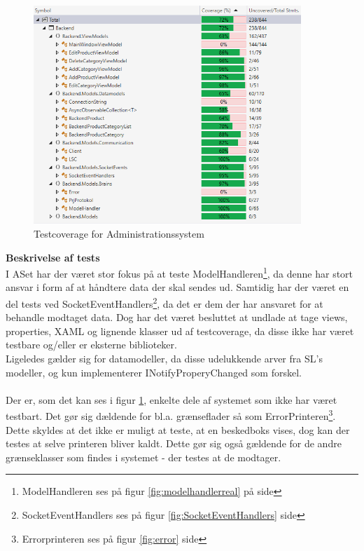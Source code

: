 \begin{figure}[htb]
	\centering
	\includegraphics[width=0.90\textwidth]{Test/Images/Backend/Coverage.png}
	\caption{Testcoverage for Administrationssystem}
	\label{fig:cover}
	\end{figure}
	

	
\textbf{Beskrivelse af tests}\\
I \gls{AS}et har der været stor fokus på at teste ModelHandleren\footnote{ModelHandleren ses på figur \ref{fig:modelhandlerreal} på side \pageref{fig:modelhandlerreal}}, da denne har stort ansvar i form af at håndtere data der skal sendes ud. Samtidig har der været en del tests ved SocketEventHandlers\footnote{SocketEventHandlers ses på figur \ref{fig:SocketEventHandlers} side \pageref{fig:SocketEventHandlers}}, da det er dem der har ansvaret for at behandle modtaget data. Dog har det været besluttet at undlade at tage views, properties, XAML og lignende klasser ud af testcoverage, da disse ikke har været testbare og/eller er eksterne biblioteker.\\
 Ligeledes gælder sig for datamodeller, da disse udelukkende arver fra \gls{SL}'s modeller, og kun implementerer INotifyProperyChanged som forskel. \\
 \\
 Der er, som det kan ses i figur \ref{fig:cover}, enkelte dele af systemet som ikke har været testbart. Det gør sig dældende for bl.a. grænseflader så som ErrorPrinteren\footnote{Errorprinteren ses på figur \ref{fig:error} side \pageref{fig:error}}. Dette skyldes at det ikke er muligt at teste, at en beskedboks vises, dog kan der testes at selve printeren bliver kaldt. Dette gør sig også gældende for de andre grænseklasser som findes i systemet - der testes at de modtager.